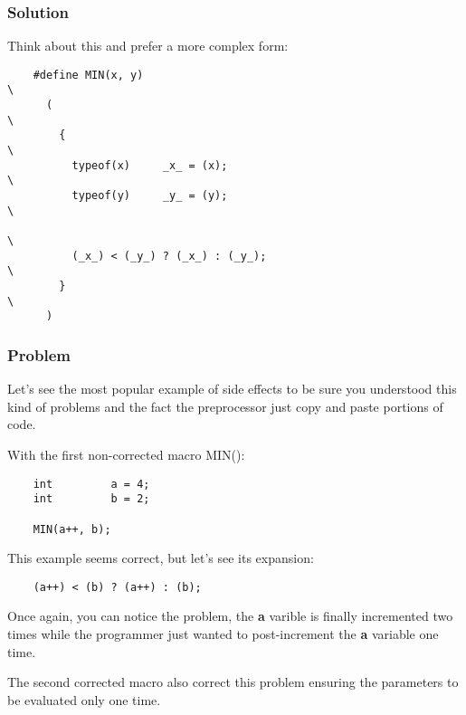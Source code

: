 
\begin{frame}[containsverbatim]
  \frametitle{Solution}

  Think about this and prefer a more complex form:

  \begin{verbatim}
    #define MIN(x, y)                                                   \
      (                                                                 \
        {                                                               \
          typeof(x)     _x_ = (x);                                      \
          typeof(y)     _y_ = (y);                                      \
                                                                        \
          (_x_) < (_y_) ? (_x_) : (_y_);                                \
        }                                                               \
      )
  \end{verbatim}
\end{frame}


\begin{frame}[containsverbatim]
  \frametitle{Problem}

  Let's see the most popular example of side effects to be sure
  you understood this kind of problems and the fact the preprocessor just copy
  and paste portions of code.

  \nl

  With the first non-corrected macro MIN():

  \begin{verbatim}
    int         a = 4;
    int	        b = 2;

    MIN(a++, b);
  \end{verbatim}

  This example seems correct, but let's see its expansion:

  \begin{verbatim}
    (a++) < (b) ? (a++) : (b);
  \end{verbatim}

  Once again, you can notice the problem, the \textbf{a} varible is finally
  incremented two times while the programmer just wanted to post-increment
  the \textbf{a} variable one time.

  \nl

  The second corrected macro also correct this problem ensuring the parameters
  to be evaluated only one time.
\end{frame}


